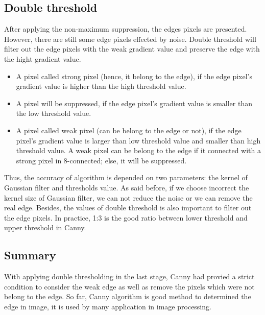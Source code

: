 	\subsection{Double threshold}
	After applying the non-maximum suppression, the edges pixels are presented. However, there are still some edge pixels effected by noise. Double threshold will filter out the edge pixels with the weak gradient value and preserve the edge with the hight gradient value.
	\begin{itemize}
		\item A pixel called strong pixel (hence, it belong to the edge), if the edge pixel's gradient value is higher than the high threshold value.
		\item A pixel will be suppressed, if the edge pixel's gradient value is smaller than the low threshold value.
		\item A pixel called weak pixel (can be belong to the edge or not), if the edge pixel's gradient value is larger than low threshold value and smaller than high threshold value. A weak pixel can be belong to the edge if it connected with a strong pixel in 8-connected; else, it will be suppressed.
	\end{itemize}
	Thus, the accuracy of algorithm is depended on two parameters: the kernel of Gaussian filter and thresholds value. As said before, if we choose incorrect the kernel size of Gaussian filter, we can not reduce the noise or we can remove the real edge. Besides, the values of double threshold is also important to filter out the edge pixels. In practice, 1:3 is the good ratio between lower threshold  and upper threshold in Canny.
	\subsection{Summary}
	With applying double thresholding in the last stage, Canny had provied a strict condition to consider the weak edge as well as remove the pixels which were not belong to the edge. So far, Canny algorithm is good method to determined the edge in image, it is used by many application in image processing.
